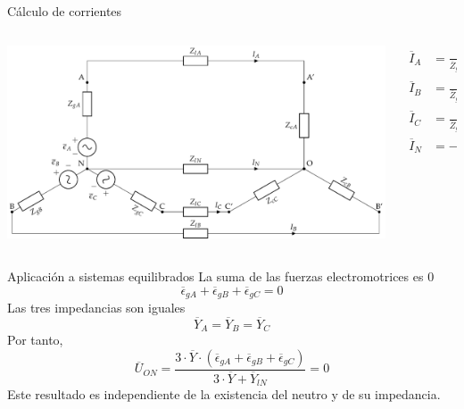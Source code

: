 \documentclass[aspectratio=169, usenames,svgnames,dvipsnames]{beamer}
\begin{document}
\begin{frame}[label={sec:org0577fae}]{Cálculo de corrientes}
\begin{columns}
\begin{column}{0.7\columnwidth}
\begin{center}
\includegraphics[width=\textwidth]{../figs/CircuitoTrifasicaGeneralizado.pdf}
\end{center}
\end{column}

\begin{column}{0.3\columnwidth}
\begin{align*}
  \overline{I}_A &= \frac{\overline{\epsilon}_A - \overline{U}_{ON}}{\overline{Z}_{gA} + \overline{Z}_{lA} + \overline{Z}_{cA}}\\
  \overline{I}_B &= \frac{\overline{\epsilon}_B - \overline{U}_{ON}}{\overline{Z}_{gB} + \overline{Z}_{lB} + \overline{Z}_{cB}}\\
  \overline{I}_C &= \frac{\overline{\epsilon}_C - \overline{U}_{ON}}{\overline{Z}_{gC} + \overline{Z}_{lC} + \overline{Z}_{cC}}\\
  \overline{I}_N &= -\overline{I}_A -\overline{I}_B -\overline{I}_C
\end{align*}
\end{column}
\end{columns}
\end{frame}

\begin{frame}[label={sec:org28560c0}]{Aplicación a sistemas equilibrados}
La suma de las fuerzas electromotrices es 0
\[
  \overline{\epsilon}_{gA} + \overline{\epsilon}_{gB} + \overline{\epsilon}_{gC} = 0
\]
Las tres impedancias son iguales
\[
  \overline{Y}_A = \overline{Y}_B = \overline{Y}_C
\]
Por tanto,
\[
  \overline{U}_{ON} = \frac{3 \cdot \overline{Y} \cdot \left(  \overline{\epsilon}_{gA} + \overline{\epsilon}_{gB} + \overline{\epsilon}_{gC}\right)}{3 \cdot \overline{Y} + \overline{Y}_{lN}} = 0
\]
Este resultado es independiente de la existencia del neutro y de su impedancia.
\end{frame}
\end{document}
